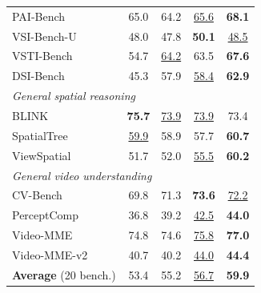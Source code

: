\documentclass{llmxive}
\providecommand{\arraystretch}{1.15}
\begin{document}
\begin{table}[t]
{\begin{tabular}[t]{l cccc}
  \quad PAI-Bench~\citep{zhou2025paibench}      & 65.0 & 64.2 & \cellcolor{secondcell}\underline{65.6} & \cellcolor{bestcell}\textbf{68.1} \\
  \quad VSI-Bench-U~\citep{brown2025shortcuts}  & 48.0 & 47.8 & \cellcolor{bestcell}\textbf{50.1} & \cellcolor{secondcell}\underline{48.5} \\
  \quad VSTI-Bench~\citep{fan2025vlm}           & 54.7 & \cellcolor{secondcell}\underline{64.2} & 63.5 & \cellcolor{bestcell}\textbf{67.6} \\
  \quad DSI-Bench~\citep{zhang2025dsibench}     & 45.3 & 57.9 & \cellcolor{secondcell}\underline{58.4} & \cellcolor{bestcell}\textbf{62.9} \\
  \midrule
  \multicolumn{5}{l}{\textit{General spatial reasoning}} \\
  \quad BLINK~\citep{fu2024blink}               & \cellcolor{bestcell}\textbf{75.7} & \cellcolor{secondcell}\underline{73.9} & \cellcolor{secondcell}\underline{73.9} & 73.4 \\
  \quad SpatialTree~\citep{xiao2025spatialtree} & \cellcolor{secondcell}\underline{59.9} & 58.9 & 57.7 & \cellcolor{bestcell}\textbf{60.7} \\
  \quad ViewSpatial~\citep{li2025viewspatial}   & 51.7 & 52.0 & \cellcolor{secondcell}\underline{55.5} & \cellcolor{bestcell}\textbf{60.2} \\
  \midrule
  \multicolumn{5}{l}{\textit{General video understanding}} \\
  \quad CV-Bench~\citep{zhu2025cvbench}          & 69.8 & 71.3 & \cellcolor{bestcell}\textbf{73.6} & \cellcolor{secondcell}\underline{72.2} \\
  \quad PerceptComp~\citep{li2026perceptioncomp}& 36.8 & 39.2 & \cellcolor{secondcell}\underline{42.5} & \cellcolor{bestcell}\textbf{44.0} \\
  \quad Video-MME~\citep{fu2025video}           & 74.8 & 74.6 & \cellcolor{secondcell}\underline{75.8} & \cellcolor{bestcell}\textbf{77.0} \\
  \quad Video-MME-v2~\citep{videommev2_2026}    & 40.7 & 40.2 & \cellcolor{secondcell}\underline{44.0} & \cellcolor{bestcell}\textbf{44.4} \\
  \midrule
  \textbf{Average} (20 bench.) & 53.4 & 55.2 & \cellcolor{secondcell}\underline{56.7} & \cellcolor{bestcell}\textbf{59.9} \\
  \bottomrule
  \end{tabular}%
}
\sbox{\actionRBox}{%
  \setlength{\tabcolsep}{2pt}\renewcommand{\arraystretch}{1.05}\scriptsize
}
\end{table}
\end{document}
